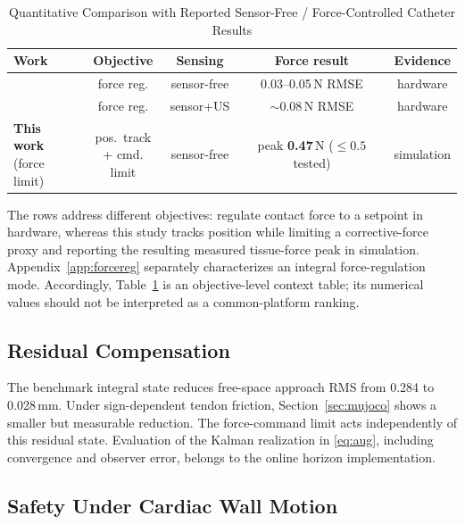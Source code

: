 \begin{table}[!t]
\caption{Quantitative Comparison with Reported Sensor-Free / Force-Controlled Catheter Results}
\label{tab:quant}
\centering
\footnotesize
\setlength{\tabcolsep}{3pt}
\begin{tabular}{lcccc}
\toprule
Work & Objective & Sensing & Force result & Evidence \\
\midrule
\cite{jolaei2020} & force reg. & sensor-free & 0.03--0.05\,N RMSE & hardware \\
\cite{kesner2014} & force reg. & sensor+US & ${\sim}0.08$\,N RMSE & hardware \\
\shortstack[l]{\textbf{This work}\\(force limit)} & \shortstack[c]{pos.\ track\\+ cmd. limit} & sensor-free & \shortstack[c]{peak \textbf{0.47}\,N\\($\le0.5$ tested)} & simulation \\
\bottomrule
\end{tabular}
\end{table}

The rows address different objectives: \cite{jolaei2020,kesner2014} regulate contact force to a setpoint in hardware, whereas this study tracks position while limiting a corrective-force proxy and reporting the resulting measured tissue-force peak in simulation. Appendix~\ref{app:forcereg} separately characterizes an integral force-regulation mode. Accordingly, Table~\ref{tab:quant} is an objective-level context table; its numerical values should not be interpreted as a common-platform ranking.

\subsection{Residual Compensation}

The benchmark integral state reduces free-space approach RMS from 0.284 to 0.028\,mm. Under sign-dependent tendon friction, Section~\ref{sec:mujoco} shows a smaller but measurable reduction. The force-command limit acts independently of this residual state. Evaluation of the Kalman realization in \eqref{eq:aug}, including convergence and observer error, belongs to the online horizon implementation.

\subsection{Safety Under Cardiac Wall Motion}\label{sec:cardiac}

